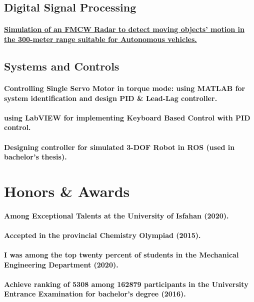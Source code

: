\documentclass[a4paper]{article}
\begin{document}
        \subsection{Digital Signal Processing}
            \paragraph{\href{https://github.com/ake1999/FMCW_Radar_Ake}{Simulation of an FMCW Radar to detect moving objects' motion in the 300-meter range suitable for Autonomous vehicles.}}
        \subsection{Systems and Controls}
            \paragraph{Controlling Single Servo Motor in torque mode: using MATLAB for system identification and design PID \& Lead-Lag controller.}
            \paragraph{using LabVIEW for implementing Keyboard Based Control with PID control.}
            \paragraph{Designing controller for simulated 3-DOF Robot in ROS (used in bachelor's thesis).}\pagebreak
    \section{Honors \& Awards}
        \paragraph{Among Exceptional Talents at the University of Isfahan (2020).}
        \paragraph{Accepted in the provincial Chemistry Olympiad (2015).}
        \paragraph{I was among the top twenty percent of students in the Mechanical Engineering Department (2020).}
        \paragraph{Achieve ranking of 5308 among 162879 participants in the University Entrance Examination for bachelor's degree (2016).}
\end{document}
